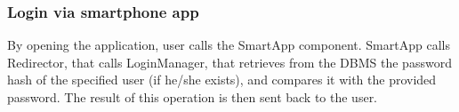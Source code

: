 \subsubsection{Login via smartphone app}
\begin{figure}[H]
	\noindent
\end{figure}
By opening the application, user calls the SmartApp component. SmartApp calls Redirector, that calls LoginManager, that retrieves from the DBMS the password hash of the specified user (if he/she exists), and compares it with the provided password. The result of this operation is then sent back to the user.\\

